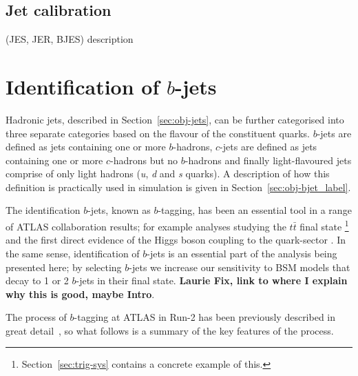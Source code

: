 \subsection{Jet calibration}
(JES, JER, BJES) description

\section{Identification of $b$-jets}
\label{sec:obj-bjets}

Hadronic jets, described in Section~\ref{sec:obj-jets}, can be further categorised into three separate categories based on the flavour of the constituent quarks.
$b$-jets are defined as jets containing one or more $b$-hadrons,
$c$-jets are defined as jets containing one or more $c$-hadrons but no $b$-hadrons
and finally light-flavoured jets comprise of only light hadrons (\textit{u}, \textit{d} and \textit{s} quarks).
A description of how this definition is practically used in simulation is given in Section~\ref{sec:obj-bjet_label}.

The identification $b$-jets, known as $b$-tagging, has been an essential tool in a range of ATLAS collaboration results;
for example analyses studying the $t\bar{t}$ final state \cite{obj-ttbar} \footnote{Section~\ref{sec:trig-sys} contains a concrete example of this.}
and the first direct evidence of the Higgs boson coupling to the quark-sector \cite{obj-Hbb}.
In the same sense, identification of $b$-jets is an essential part of the analysis being presented here;
by selecting $b$-jets we increase our sensitivity to BSM models that decay to 1 or 2 $b$-jets in their final state.
\textbf{Laurie Fix, link to where I explain why this is good, maybe Intro}.

The process of $b$-tagging at ATLAS in Run-2 has been previously described in great
detail~\cite{obj-bjet_algo_2015,obj-bjet_algo_2016},
so what follows is a summary of the key features of the process.

